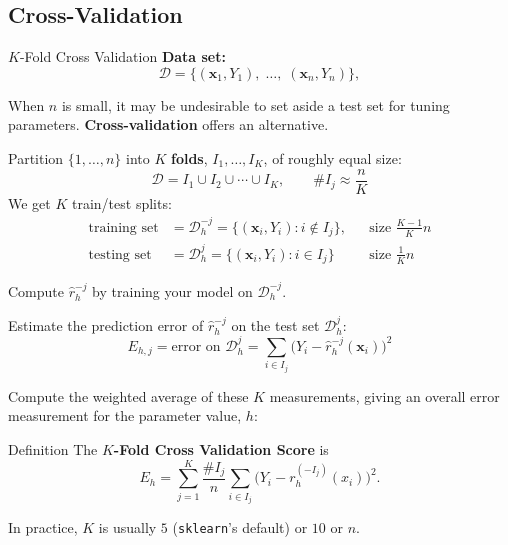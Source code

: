 \documentclass[xcolor={dvipsnames}]{beamer}
\renewcommand{\hat}{\widehat}
\newcommand{\cD}{\mathcal{D}}
\newcommand{\vx}{\mathbf{x}}
\begin{document}
\subsection{Cross-Validation}
\begin{frame}{$K$-Fold Cross Validation}
    \setlength\parskip{0.75em}
    \textbf{Data set:}
    $$\cD = \{(\vx_1,Y_1),\;\ldots,\;(\vx_n, Y_n)\},$$

    When $n$ is small, it may be undesirable to set aside a test set for tuning parameters.
    \textbf{Cross-validation} offers an alternative.

    Partition $\{1,\ldots,n\}$ into $K$ \textbf{folds}, $I_1,\ldots,I_K$, of roughly equal size:
    \[
        \cD = I_1\cup I_2\cup\cdots\cup I_K,\qquad \#I_j\approx \frac nK
    \]
    We get $K$ train/test splits:
    \begin{align*}
        \text{training set}& =\cD_h^{-j} = \{(\vx_i, Y_i) : i\notin I_j\},&&\text{size }\frac{K-1}Kn\\
        \text{testing set}& = \cD_h^{j}  = \{(\vx_i, Y_i) : i\in I_j\}&&\text{size }\frac{1}Kn
    \end{align*}
\end{frame}

\begin{frame}
    \setlength\parskip{0.75em}
    Compute $\hat r_h^{-j}$ by training your model on $\cD_h^{-j}$.

    Estimate the prediction error of $\hat r_h^{-j}$ on the test set $\cD_h^{j}$:
    \[
        E_{h,j} = \text{error on $\cD_h^{j}$} = \sum_{i\in I_j}\big(Y_i - \hat r_h^{-j}(\vx_i)\big)^2
    \]

    Compute the weighted average of these $K$ measurements,
    giving an overall error measurement for the parameter value, $h$:
    
    \begin{block}{Definition}
        The \textbf{$K$-Fold Cross Validation Score} is
        \[
           E_h = \sum_{j=1}^K\frac{\# I_j}{n}\sum_{i\in I_j}\big(Y_i - r_h^{(-I_j)}(x_i)\big)^2.
        \]
    \end{block}
    
    In practice, $K$ is usually $5$ (\texttt{sklearn}'s default) or $10$ or $n$.
\end{frame}
\end{document}
